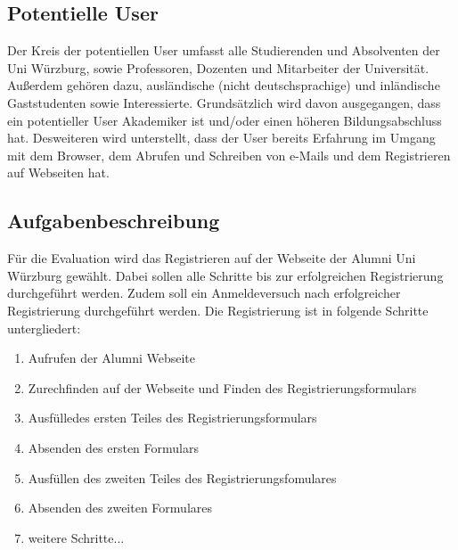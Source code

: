 \documentclass[fontsize=12pt,a4paper]{scrartcl}
\begin{document}
\subsection{Potentielle User}
Der Kreis der potentiellen User umfasst alle Studierenden und Absolventen der Uni Würzburg, sowie Professoren, Dozenten und Mitarbeiter der Universität. Außerdem gehören dazu, ausländische (nicht deutschsprachige) und inländische Gaststudenten sowie Interessierte. Grundsätzlich wird davon ausgegangen, dass ein potentieller User Akademiker ist und/oder einen höheren Bildungsabschluss hat. Desweiteren wird unterstellt, dass der User bereits Erfahrung im Umgang mit dem Browser, dem Abrufen und Schreiben von e-Mails und dem Registrieren auf Webseiten hat. 


\subsection{Aufgabenbeschreibung}
Für die Evaluation wird das Registrieren auf der Webseite der Alumni Uni Würzburg gewählt. Dabei sollen alle Schritte bis zur erfolgreichen Registrierung durchgeführt werden. Zudem soll ein Anmeldeversuch nach erfolgreicher Registrierung durchgeführt werden.
Die Registrierung ist in folgende Schritte untergliedert:
\begin{enumerate}
	\item Aufrufen der Alumni Webseite
	\item Zurechfinden auf der Webseite und Finden des Registrierungsformulars
	\item Ausfülledes ersten Teiles des Registrierungsformulars
	\item Absenden des ersten Formulars
	\item Ausfüllen des zweiten Teiles des Registrierungsfomulares
	\item Absenden des zweiten Formulares
	\item weitere Schritte...
\end{enumerate}
 
 
\end{document}
